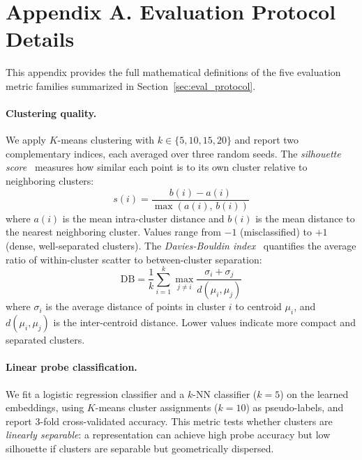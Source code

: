\documentclass[pmlr]{jmlr}%
\begin{document}



\newpage
\appendix
\section*{Appendix A. Evaluation Protocol Details}
\label{app:eval_details}

This appendix provides the full mathematical definitions of the five evaluation metric families summarized in Section~\ref{sec:eval_protocol}.

\paragraph{Clustering quality.}
We apply $K$-means clustering with $k \in \{5, 10, 15, 20\}$ and report two complementary indices, each averaged over three random seeds. The \emph{silhouette score}~\citep{rousseeuw1987silhouettes} measures how similar each point is to its own cluster relative to neighboring clusters:
\begin{equation}
    s(i) = \frac{b(i) - a(i)}{\max(a(i),\, b(i))}
\end{equation}
where $a(i)$ is the mean intra-cluster distance and $b(i)$ is the mean distance to the nearest neighboring cluster. Values range from $-1$ (misclassified) to $+1$ (dense, well-separated clusters). The \emph{Davies-Bouldin index}~\citep{davies1979cluster} quantifies the average ratio of within-cluster scatter to between-cluster separation:
\begin{equation}
    \text{DB} = \frac{1}{k}\sum_{i=1}^{k} \max_{j \neq i} \frac{\sigma_i + \sigma_j}{d(\mu_i, \mu_j)}
\end{equation}
where $\sigma_i$ is the average distance of points in cluster $i$ to centroid $\mu_i$, and $d(\mu_i, \mu_j)$ is the inter-centroid distance. Lower values indicate more compact and separated clusters.

\paragraph{Linear probe classification.}
We fit a logistic regression classifier and a $k$-NN classifier ($k{=}5$) on the learned embeddings, using $K$-means cluster assignments ($k{=}10$) as pseudo-labels, and report 3-fold cross-validated accuracy. This metric tests whether clusters are \emph{linearly separable}: a representation can achieve high probe accuracy but low silhouette if clusters are separable but geometrically dispersed.
\end{document}
